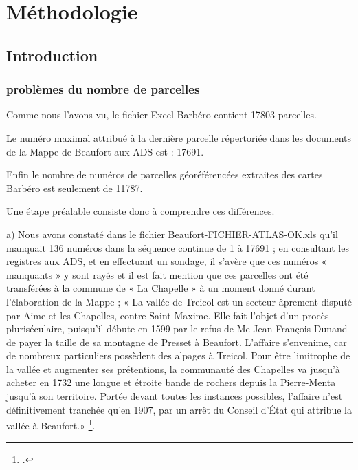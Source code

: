 
\chapter{Méthodologie}

\maketitle

\section{Introduction}


\subsection{problèmes du nombre de parcelles}

Comme nous l’avons vu, le fichier Excel Barbéro contient 17803 parcelles.

Le numéro maximal attribué à la dernière parcelle répertoriée dans les documents de la Mappe de Beaufort aux ADS est : 17691.

Enfin le nombre de numéros de parcelles géoréférencées extraites des cartes Barbéro est seulement de 11787.

Une étape préalable consiste donc à comprendre ces différences.

a)	Nous avons constaté dans le fichier Beaufort-FICHIER-ATLAS-OK.xls qu’il manquait 136 numéros dans la séquence continue de 1 à 17691 ; en consultant les registres aux ADS, et en effectuant un sondage, il s’avère que ces numéros « manquants » y sont rayés et il est fait mention que ces parcelles ont été transférées  à la commune de « La Chapelle » à un moment donné durant l’élaboration de la Mappe ; « La vallée de Treicol est un secteur âprement disputé par Aime et les Chapelles, contre Saint-Maxime. Elle fait l’objet d’un procès pluriséculaire, puisqu’il débute en 1599 par le refus de Me Jean-François Dunand de payer la taille de sa montagne de Presset à Beaufort. L’affaire s’envenime, car de nombreux particuliers possèdent des alpages à Treicol. Pour être limitrophe de la vallée et augmenter ses prétentions, la communauté des Chapelles va jusqu’à acheter en 1732 une longue et étroite bande de rochers depuis la Pierre-Menta jusqu’à son territoire. Portée devant toutes les instances possibles, l’affaire n’est définitivement tranchée qu’en 1907, par un arrêt du Conseil d’État qui attribue la vallée à Beaufort.» 	\footcite{HViallet1993}.

